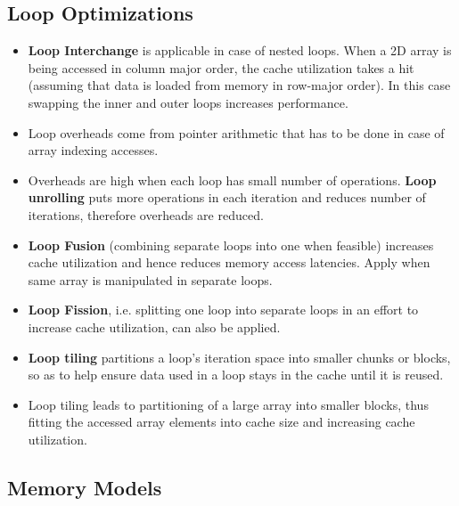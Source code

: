 \documentclass{article}
\begin{document}
\subsection{Loop Optimizations}
\begin{itemize}
    \item \textbf{Loop Interchange} is applicable in case of nested loops. When a 2D array is being accessed in column major order, the cache utilization takes a hit (assuming that data is loaded from memory in row-major order). In this case swapping the inner and outer loops increases performance.

    \item Loop overheads come from pointer arithmetic that has to be done in case of array indexing accesses. 
    
    \item Overheads are high when each loop has small number of operations. \textbf{Loop unrolling} puts more operations in each iteration and reduces number of iterations, therefore overheads are reduced. 

    \item \textbf{Loop Fusion} (combining separate loops into one when feasible) increases cache utilization and hence reduces memory access latencies. Apply when same array is manipulated in separate loops.
    
    \item \textbf{Loop Fission}, i.e. splitting one loop into separate loops in an effort to increase cache utilization, can also be applied.
    
    \item \textbf{Loop tiling} partitions a loop's iteration space into smaller chunks or blocks, so as to help ensure data used in a loop stays in the cache until it is reused. 
    
    \item Loop tiling leads to partitioning of a large array into smaller blocks, thus fitting the accessed array elements into cache size and increasing cache utilization.
\end{itemize}

\subsection{Memory Models}
\end{document}
